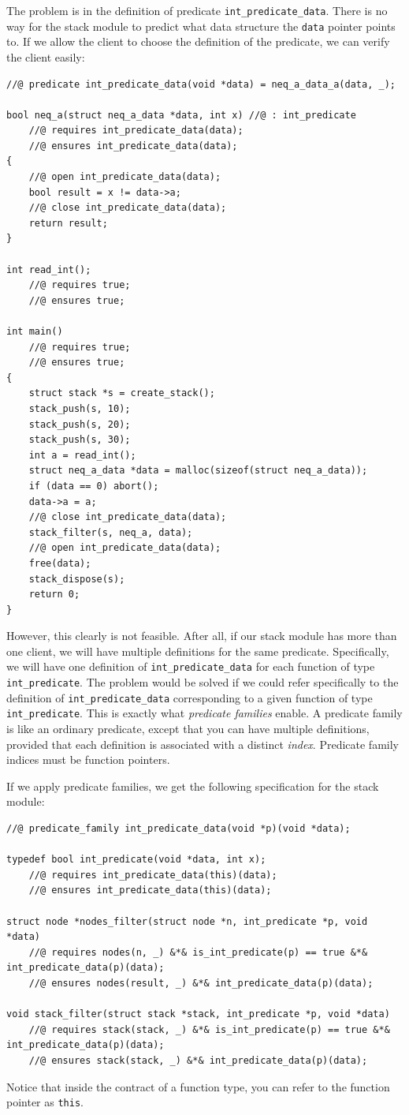 \documentclass{article}
\begin{document}
The problem is in the definition of predicate
\lstinline!int_predicate_data!. There is no way for the stack
module to predict what data structure the \lstinline!data!
pointer points to. If we allow the client to choose the
definition of the predicate, we can verify the client easily:
\begin{lstlisting}
//@ predicate int_predicate_data(void *data) = neq_a_data_a(data, _);

bool neq_a(struct neq_a_data *data, int x) //@ : int_predicate
    //@ requires int_predicate_data(data);
    //@ ensures int_predicate_data(data);
{
    //@ open int_predicate_data(data);
    bool result = x != data->a;
    //@ close int_predicate_data(data);
    return result;
}

int read_int();
    //@ requires true;
    //@ ensures true;

int main()
    //@ requires true;
    //@ ensures true;
{
    struct stack *s = create_stack();
    stack_push(s, 10);
    stack_push(s, 20);
    stack_push(s, 30);
    int a = read_int();
    struct neq_a_data *data = malloc(sizeof(struct neq_a_data));
    if (data == 0) abort();
    data->a = a;
    //@ close int_predicate_data(data);
    stack_filter(s, neq_a, data);
    //@ open int_predicate_data(data);
    free(data);
    stack_dispose(s);
    return 0;
}
\end{lstlisting}

However, this clearly is not feasible. After all, if our stack
module has more than one client, we will have multiple
definitions for the same predicate. Specifically, we will have
one definition of \lstinline!int_predicate_data! for each
function of type \lstinline!int_predicate!. The problem would
be solved if we could refer specifically to the definition of
\lstinline!int_predicate_data! corresponding to a given
function of type \lstinline!int_predicate!. This is exactly
what \emph{predicate families} enable. A predicate family is
like an ordinary predicate, except that you can have multiple
definitions, provided that each definition is associated with a
distinct \emph{index}. Predicate family indices must be
function pointers.

If we apply predicate families, we get the following
specification for the stack module:
\begin{lstlisting}
//@ predicate_family int_predicate_data(void *p)(void *data);

typedef bool int_predicate(void *data, int x);
    //@ requires int_predicate_data(this)(data);
    //@ ensures int_predicate_data(this)(data);

struct node *nodes_filter(struct node *n, int_predicate *p, void *data)
    //@ requires nodes(n, _) &*& is_int_predicate(p) == true &*& int_predicate_data(p)(data);
    //@ ensures nodes(result, _) &*& int_predicate_data(p)(data);

void stack_filter(struct stack *stack, int_predicate *p, void *data)
    //@ requires stack(stack, _) &*& is_int_predicate(p) == true &*& int_predicate_data(p)(data);
    //@ ensures stack(stack, _) &*& int_predicate_data(p)(data);
\end{lstlisting}
Notice that inside the contract of a function type, you can
refer to the function pointer as \lstinline!this!.
\end{document}
